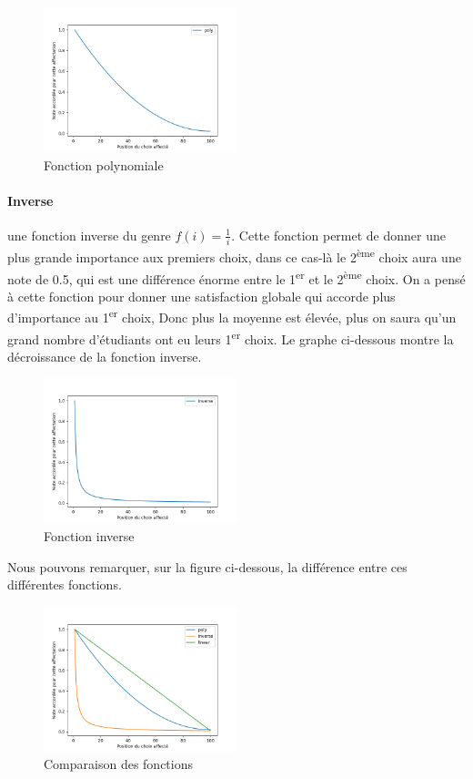 \documentclass[12pt,titlepage]{article}
\begin{document}
\begin{figure}[!h]
\centering
\includegraphics[width = 0.5\textwidth]{img/poly.png}
\caption{Fonction polynomiale}
\end{figure}

\paragraph{Inverse} une fonction inverse du genre $f(i) = \frac{1}{i}$. Cette fonction permet de donner une plus grande importance aux premiers choix, dans ce cas-là le 2\textsuperscript{ème} choix aura une note de 0.5, qui est une différence énorme entre le 1\textsuperscript{er} et le 2\textsuperscript{ème} choix. On a pensé à cette fonction pour donner une satisfaction globale qui accorde plus d'importance au 1\textsuperscript{er} choix, Donc plus la moyenne est élevée, plus on saura qu'un grand nombre d'étudiants ont eu leurs 1\textsuperscript{er} choix. Le graphe ci-dessous montre la décroissance de la fonction inverse.

\begin{figure}[!h]
\centering
\includegraphics[width = 0.5\textwidth]{img/inverse.png}
\caption{Fonction inverse}
\end{figure}

Nous pouvons remarquer, sur la figure ci-dessous, la différence entre ces différentes fonctions.

\begin{figure}[!h]
  \centering
  \includegraphics[width = 0.5\textwidth]{img/comparatif.png}
  \caption{Comparaison des fonctions}
\end{figure}
\end{document}
